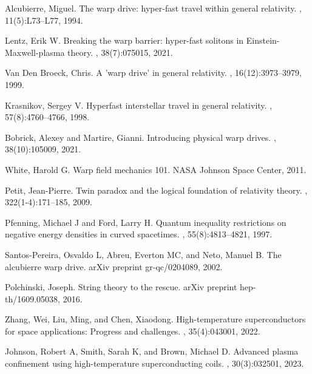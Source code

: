 \documentclass[12pt,a4paper]{article}
\begin{document}
\begin{thebibliography}{99}

Alcubierre, Miguel.
\newblock The warp drive: hyper-fast travel within general relativity.
, 11(5):L73--L77, 1994.

Lentz, Erik W.
\newblock Breaking the warp barrier: hyper-fast solitons in Einstein-Maxwell-plasma theory.
, 38(7):075015, 2021.

Van Den Broeck, Chris.
\newblock A 'warp drive' in general relativity.
, 16(12):3973--3979, 1999.

Krasnikov, Sergey V.
\newblock Hyperfast interstellar travel in general relativity.
, 57(8):4760--4766, 1998.

Bobrick, Alexey and Martire, Gianni.
\newblock Introducing physical warp drives.
, 38(10):105009, 2021.

White, Harold G.
\newblock Warp field mechanics 101.
\newblock NASA Johnson Space Center, 2011.

Petit, Jean-Pierre.
\newblock Twin paradox and the logical foundation of relativity theory.
, 322(1-4):171--185, 2009.

Pfenning, Michael J and Ford, Larry H.
\newblock Quantum inequality restrictions on negative energy densities in curved spacetimes.
, 55(8):4813--4821, 1997.

Santos-Pereira, Osvaldo L, Abreu, Everton MC, and Neto, Manuel B.
\newblock The alcubierre warp drive.
\newblock arXiv preprint gr-qc/0204089, 2002.

Polchinski, Joseph.
\newblock String theory to the rescue.
\newblock arXiv preprint hep-th/1609.05038, 2016.

Zhang, Wei, Liu, Ming, and Chen, Xiaodong.
\newblock High-temperature superconductors for space applications: Progress and challenges.
, 35(4):043001, 2022.

Johnson, Robert A, Smith, Sarah K, and Brown, Michael D.
\newblock Advanced plasma confinement using high-temperature superconducting coils.
, 30(3):032501, 2023.


\end{thebibliography}
\end{document}
